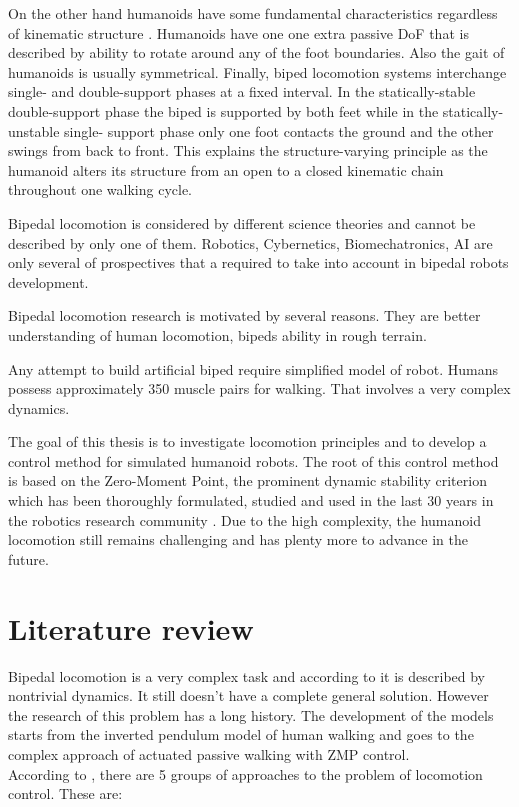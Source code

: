 \documentclass[12pt,a4paper]{report}
\begin{document}
		On the other hand humanoids have some fundamental characteristics regardless of kinematic structure \cite{vukobratovic2004zero}. Humanoids have one one extra passive DoF that is described by ability to rotate around any of the foot boundaries. Also the gait of humanoids is usually symmetrical. Finally, biped locomotion systems interchange single- and double-support phases at a fixed interval. In the statically-stable double-support phase the biped is supported by both feet while in the statically-unstable single- support phase only one foot contacts the ground and the other swings from back to front. This explains the structure-varying principle as the humanoid alters its structure from an open to a closed kinematic chain throughout one walking cycle. \cite{controlbipedal}
		
		Bipedal locomotion is considered by different science theories and cannot be described by only one of them. Robotics, Cybernetics, Biomechatronics, AI are only several of prospectives that a required to take into account in bipedal robots development.
		
		Bipedal locomotion research is motivated by several reasons. They are better understanding of human locomotion, bipeds ability in rough terrain.
		
		Any attempt to build artificial biped require simplified model of robot. Humans possess approximately 350 muscle pairs for walking. That involves a very complex dynamics.
		
		
		The goal of this thesis is to investigate locomotion principles and to develop a control method for simulated humanoid robots. The root of this control method is based on the Zero-Moment Point, the prominent dynamic stability criterion which has been thoroughly formulated, studied and used in the last 30 years in the robotics research community \cite{controlbipedal}. Due to the high complexity, the humanoid locomotion still remains challenging and has plenty more to advance in the future.
	\chapter{Literature review}
		Bipedal locomotion is a very complex task and according to \cite{erbatur2002study} it is described by nontrivial dynamics. It still doesn't have a complete general solution. However the research of this problem has a long history. The development of the models starts from the inverted pendulum model of human walking and goes to the complex approach of actuated passive walking with ZMP control.\\
		According to \cite{wright2014intelligent}, there are 5 groups of approaches to the problem of locomotion control. These are:
		
\end{document}
